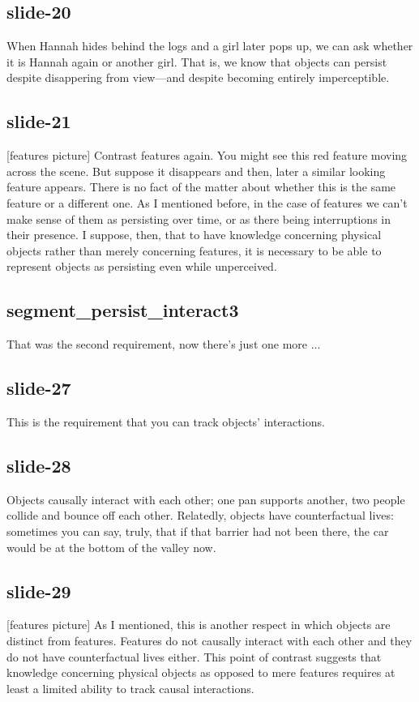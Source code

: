 \documentclass[12pt,\papersize]{extarticle}
\begin{document}
\subsection{slide-20}
When Hannah hides behind the logs and a girl later pops up, we can ask whether it is Hannah 
again or another girl.
That is, we know that objects can persist despite disappering from view---and despite becoming 
entirely imperceptible.
 
\subsection{slide-21}
[features picture]
Contrast features again.  You might see this red feature moving across the scene. 
But suppose it disappears and then, later a similar looking feature appears. 
There is no fact of the matter about whether this is the same feature or a different one.
As I mentioned before, in the case of features we can't make sense of them as persisting over 
time, or as there being interruptions in their presence.
I suppose, then, that to have knowledge concerning physical objects rather than merely 
concerning features, it is necessary to be able to represent objects as persisting
even while unperceived.
 
\subsection{segment\_persist\_interact3}
That was the second requirement, now there's just one more ...
 
\subsection{slide-27}
This is the requirement that you can track objects' interactions.
 
\subsection{slide-28}
Objects causally interact with each other; one pan supports another, two people collide and 
bounce off each other.  Relatedly, objects have counterfactual lives: sometimes you can say,
truly, that if that barrier had not been there, the car would be at the bottom of the valley 
now.
 
\subsection{slide-29}
[features picture]
As I mentioned, this is another respect in which objects are distinct from features.
Features do not causally interact with each other and they do not have counterfactual lives 
either.
This point of contrast suggests that knowledge concerning physical objects as opposed to mere
features requires at least a limited ability to track causal interactions.
 
\end{document}
